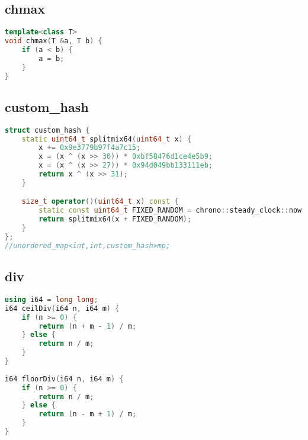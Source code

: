 \subsection{chmax}
\begin{lstlisting}[language=C++]
template<class T>
void chmax(T &a, T b) {
    if (a < b) {
        a = b;
    }
}
\end{lstlisting}
\subsection{custom\_hash}
\begin{lstlisting}[language=C++]
struct custom_hash {
    static uint64_t splitmix64(uint64_t x) {
        x += 0x9e3779b97f4a7c15;
        x = (x ^ (x >> 30)) * 0xbf58476d1ce4e5b9;
        x = (x ^ (x >> 27)) * 0x94d049bb133111eb;
        return x ^ (x >> 31);
    }

    size_t operator()(uint64_t x) const {
        static const uint64_t FIXED_RANDOM = chrono::steady_clock::now().time_since_epoch().count();
        return splitmix64(x + FIXED_RANDOM);
    }
};
//unordered_map<int,int,custom_hash>mp;
\end{lstlisting}
\subsection{div}
\begin{lstlisting}[language=C++]
using i64 = long long;
i64 ceilDiv(i64 n, i64 m) {
    if (n >= 0) {
        return (n + m - 1) / m;
    } else {
        return n / m;
    }
}
 
i64 floorDiv(i64 n, i64 m) {
    if (n >= 0) {
        return n / m;
    } else {
        return (n - m + 1) / m;
    }
}

\end{lstlisting}
